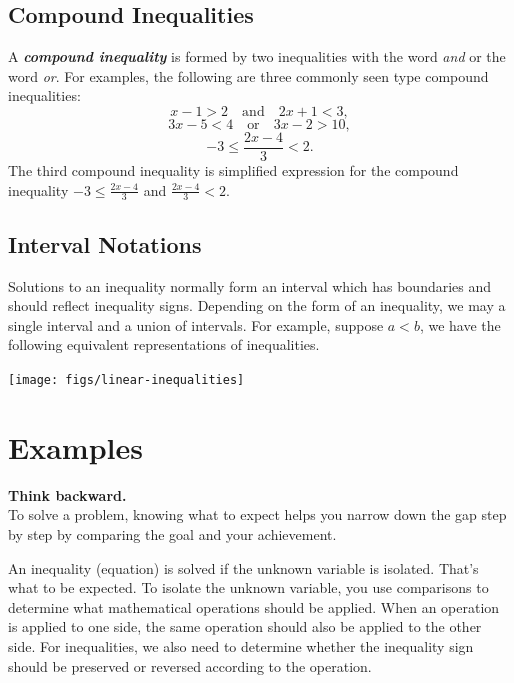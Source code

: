 \documentclass[
  en,11pt]{elegantbook}
\newcommand{\size}[2]{{\fontsize{#1}{0}\selectfont#2}}
\newenvironment{rmdtip}{
	\vspace*{0.5\baselineskip}
	\par\noindent
	\makebox[-3pt][r]{\color{red!90}\size{12}{\HandRight}\,\,}
    \begin{tcolorbox}[
    enhanced,
    title={\textbf{\color{second}Tips}},
    title style={left color=blue!10!green!20!white,right color=yellow!20!blue!20!white},
    colback=cyan!10!white,
    ]
    \sffamily
}{
    \end{tcolorbox}
    \par\ignorespacesafterend
}
\begin{document}
\hypertarget{compound-inequalities}{%
\subsection*{Compound Inequalities}\label{compound-inequalities}}

A \textbf{\emph{compound inequality}} is formed by two inequalities with the word \emph{and} or the word \emph{or}. For examples, the following are three commonly seen type compound inequalities:
\[
x-1>2\quad \text{and} \quad 2x+1<3,
\]
\[
3x-5<4\quad \text{or} \quad 3x-2>10,
\]
\[
-3\leq \frac{2x-4}{3}<2.
\]
The third compound inequality is simplified expression for the compound inequality \(-3\leq \frac{2x-4}{3}\) and \(\frac{2x-4}{3}<2\).

\hypertarget{interval-notations}{%
\subsection*{Interval Notations}\label{interval-notations}}

Solutions to an inequality normally form an interval which has boundaries and should reflect inequality signs. Depending on the form of an inequality, we may a single interval and a union of intervals. For example, suppose \(a<b\), we have the following equivalent representations of inequalities.

\begin{center}\texttt{[image: figs/linear-inequalities]} \end{center}

\hypertarget{examples}{%
\section{Examples}\label{examples}}

\begin{rmdtip}

\textbf{Think backward.}\\
To solve a problem, knowing what to expect helps you narrow down the gap step by step by comparing the goal and your achievement.

An inequality (equation) is solved if the unknown variable is isolated. That's what to be expected. To isolate the unknown variable, you use comparisons to determine what mathematical operations should be applied. When an operation is applied to one side, the same operation should also be applied to the other side. For inequalities, we also need to determine whether the inequality sign should be preserved or reversed according to the operation.

\end{rmdtip}
\end{document}
